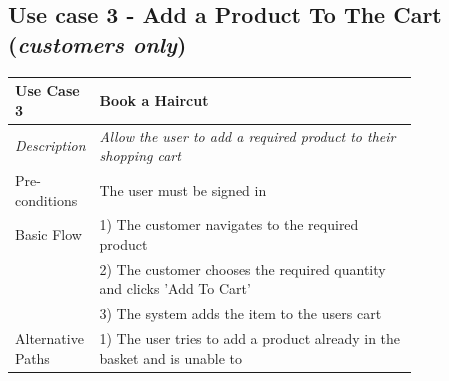 \documentclass[12pt]{article}
\begin{document}
	\subsection{Use case 3 - Add a Product To The Cart (\emph{customers only})}
	\label{chap:use-cases-3}
	\begin{table}[H]
		\begin{tabular}{|l|p{0.8\linewidth}}
			\hline
			\rowcolor[HTML]{EFEFEF} 
			\textbf{Use Case 3}  & \textbf{Book a Haircut}                                                   \\ \hline
			\rowcolor[HTML]{F5FBFF} 
			\textit{Description} & \textit{Allow the user to add a required product to their shopping cart}                                 \\ \hline
			\rowcolor[HTML]{EFEFEF} 
			Pre-conditions       & The user must be signed in                                                \\ \hline
			\rowcolor[HTML]{F5FBFF} 
			Basic Flow           & 1) The customer navigates to the required product                         \\
			\rowcolor[HTML]{F5FBFF} 
			& 2) The customer chooses the required quantity and clicks 'Add To Cart'    \\
			\rowcolor[HTML]{F5FBFF} 
			& 3) The system adds the item to the users cart                             \\
			\rowcolor[HTML]{F5FBFF}                                   \hline
			\rowcolor[HTML]{EFEFEF} 
			Alternative Paths    & 1) The user tries to add a product already in the basket and is unable to
		\end{tabular}
	\end{table}
\end{document}
